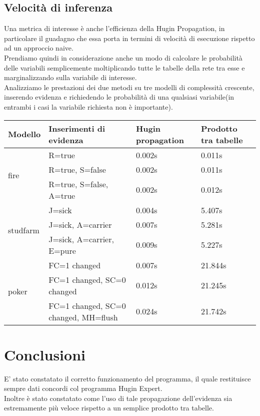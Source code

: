\documentclass[a4paper]{article}
\begin{document}
\subsection{Velocità di inferenza}
Una metrica di interesse è anche l'efficienza della Hugin Propagation, in particolare il guadagno che essa porta in termini di velocità di esecuzione rispetto ad un approccio naive.\\
Prendiamo quindi in considerazione anche un modo di calcolare le probabilità delle variabili semplicemente moltiplicando tutte le tabelle della rete tra esse e marginalizzando sulla variabile di interesse.\\
Analizziamo le prestazioni dei due metodi su tre modelli di complessità crescente, inserendo evidenza e richiedendo le probabilità di una qualsiasi variabile(in entrambi i casi la variabile richiesta non è importante).


\begin{table}[H]
\begin{tabular}{|l|l||l|l|}\hline
   Modello  & Inserimenti di evidenza  & Hugin propagation & Prodotto tra tabelle \\ \hline
  \multirow{3}{*}{fire} & R=true & 0.002s & 0.011s \\ \cline{2-4}
  & R=true, S=false& 0.002s & 0.011s \\ \cline{2-4}
  & R=true, S=false, A=true & 0.002s & 0.012s \\ \hline
    \multirow{3}{*}{studfarm} & J=sick & 0.004s & 5.407s \\ \cline{2-4}
  & J=sick, A=carrier & 0.007s & 5.281s \\ \cline{2-4}
  & J=sick, A=carrier, E=pure & 0.009s & 5.227s \\ \hline
    \multirow{3}{*}{poker} & FC=1 changed & 0.007s & 21.844s \\ \cline{2-4}
  & FC=1 changed, SC=0 changed & 0.012s & 21.245s \\ \cline{2-4}
  & FC=1 changed, SC=0 changed, MH=flush & 0.024s & 21.742s \\ \hline
  
\end{tabular}

\end{table}

\section{Conclusioni}
E' stato constatato il corretto funzionamento del programma, il quale restituisce sempre dati concordi col programma Hugin Expert.\\
Inoltre è stato constatato come l'uso di tale propagazione dell'evidenza sia estremamente più veloce rispetto a un semplice prodotto tra tabelle.
\end{document}
